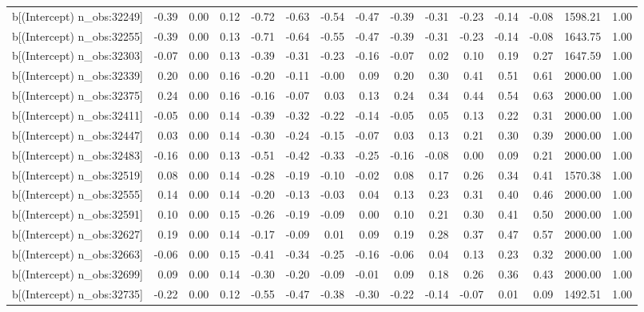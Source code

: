 \begin{table}[ht]
\begin{tabular}{rrrrrrrrrrrrrrr}
  b[(Intercept) n\_obs:32249] & -0.39 & 0.00 & 0.12 & -0.72 & -0.63 & -0.54 & -0.47 & -0.39 & -0.31 & -0.23 & -0.14 & -0.08 & 1598.21 & 1.00 \\ 
  b[(Intercept) n\_obs:32255] & -0.39 & 0.00 & 0.13 & -0.71 & -0.64 & -0.55 & -0.47 & -0.39 & -0.31 & -0.23 & -0.14 & -0.08 & 1643.75 & 1.00 \\ 
  b[(Intercept) n\_obs:32303] & -0.07 & 0.00 & 0.13 & -0.39 & -0.31 & -0.23 & -0.16 & -0.07 & 0.02 & 0.10 & 0.19 & 0.27 & 1647.59 & 1.00 \\ 
  b[(Intercept) n\_obs:32339] & 0.20 & 0.00 & 0.16 & -0.20 & -0.11 & -0.00 & 0.09 & 0.20 & 0.30 & 0.41 & 0.51 & 0.61 & 2000.00 & 1.00 \\ 
  b[(Intercept) n\_obs:32375] & 0.24 & 0.00 & 0.16 & -0.16 & -0.07 & 0.03 & 0.13 & 0.24 & 0.34 & 0.44 & 0.54 & 0.63 & 2000.00 & 1.00 \\ 
  b[(Intercept) n\_obs:32411] & -0.05 & 0.00 & 0.14 & -0.39 & -0.32 & -0.22 & -0.14 & -0.05 & 0.05 & 0.13 & 0.22 & 0.31 & 2000.00 & 1.00 \\ 
  b[(Intercept) n\_obs:32447] & 0.03 & 0.00 & 0.14 & -0.30 & -0.24 & -0.15 & -0.07 & 0.03 & 0.13 & 0.21 & 0.30 & 0.39 & 2000.00 & 1.00 \\ 
  b[(Intercept) n\_obs:32483] & -0.16 & 0.00 & 0.13 & -0.51 & -0.42 & -0.33 & -0.25 & -0.16 & -0.08 & 0.00 & 0.09 & 0.21 & 2000.00 & 1.00 \\ 
  b[(Intercept) n\_obs:32519] & 0.08 & 0.00 & 0.14 & -0.28 & -0.19 & -0.10 & -0.02 & 0.08 & 0.17 & 0.26 & 0.34 & 0.41 & 1570.38 & 1.00 \\ 
  b[(Intercept) n\_obs:32555] & 0.14 & 0.00 & 0.14 & -0.20 & -0.13 & -0.03 & 0.04 & 0.13 & 0.23 & 0.31 & 0.40 & 0.46 & 2000.00 & 1.00 \\ 
  b[(Intercept) n\_obs:32591] & 0.10 & 0.00 & 0.15 & -0.26 & -0.19 & -0.09 & 0.00 & 0.10 & 0.21 & 0.30 & 0.41 & 0.50 & 2000.00 & 1.00 \\ 
  b[(Intercept) n\_obs:32627] & 0.19 & 0.00 & 0.14 & -0.17 & -0.09 & 0.01 & 0.09 & 0.19 & 0.28 & 0.37 & 0.47 & 0.57 & 2000.00 & 1.00 \\ 
  b[(Intercept) n\_obs:32663] & -0.06 & 0.00 & 0.15 & -0.41 & -0.34 & -0.25 & -0.16 & -0.06 & 0.04 & 0.13 & 0.23 & 0.32 & 2000.00 & 1.00 \\ 
  b[(Intercept) n\_obs:32699] & 0.09 & 0.00 & 0.14 & -0.30 & -0.20 & -0.09 & -0.01 & 0.09 & 0.18 & 0.26 & 0.36 & 0.43 & 2000.00 & 1.00 \\ 
  b[(Intercept) n\_obs:32735] & -0.22 & 0.00 & 0.12 & -0.55 & -0.47 & -0.38 & -0.30 & -0.22 & -0.14 & -0.07 & 0.01 & 0.09 & 1492.51 & 1.00 \\ 

\end{tabular}
\end{table}
